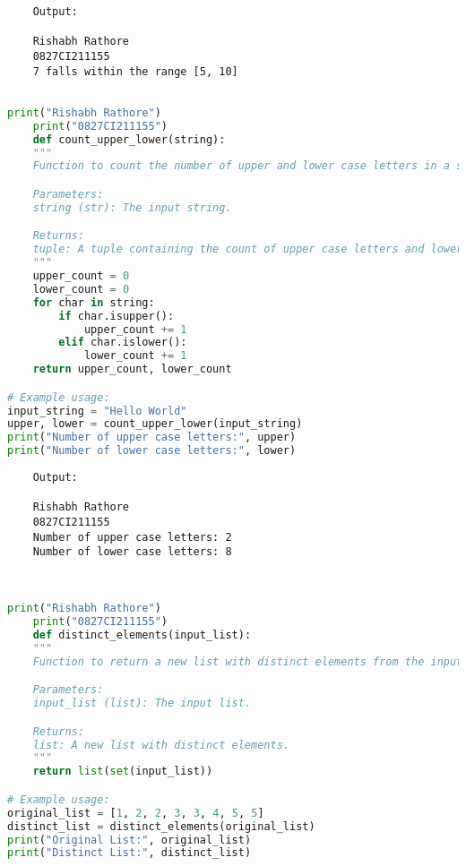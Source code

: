 \documentclass{report}
\begin{document}
\begin{verbatim}
	Output:

	Rishabh Rathore
	0827CI211155
	7 falls within the range [5, 10]


\end{verbatim}

\newpage


\sol 
\begin{lstlisting}[language=Python]
	print("Rishabh Rathore")
	print("0827CI211155")
	def count_upper_lower(string):
    """
    Function to count the number of upper and lower case letters in a string.

    Parameters:
    string (str): The input string.

    Returns:
    tuple: A tuple containing the count of upper case letters and lower case letters, respectively.
    """
    upper_count = 0
    lower_count = 0
    for char in string:
        if char.isupper():
            upper_count += 1
        elif char.islower():
            lower_count += 1
    return upper_count, lower_count

# Example usage:
input_string = "Hello World"
upper, lower = count_upper_lower(input_string)
print("Number of upper case letters:", upper)
print("Number of lower case letters:", lower)

\end{lstlisting}

\begin{verbatim}
	Output:

	Rishabh Rathore
	0827CI211155
	Number of upper case letters: 2
	Number of lower case letters: 8
	
	

\end{verbatim}

\newpage


\sol 
\begin{lstlisting}[language=Python]
	print("Rishabh Rathore")
	print("0827CI211155")
	def distinct_elements(input_list):
    """
    Function to return a new list with distinct elements from the input list.

    Parameters:
    input_list (list): The input list.

    Returns:
    list: A new list with distinct elements.
    """
    return list(set(input_list))

# Example usage:
original_list = [1, 2, 2, 3, 3, 4, 5, 5]
distinct_list = distinct_elements(original_list)
print("Original List:", original_list)
print("Distinct List:", distinct_list)
  

\end{lstlisting}
\end{document}
